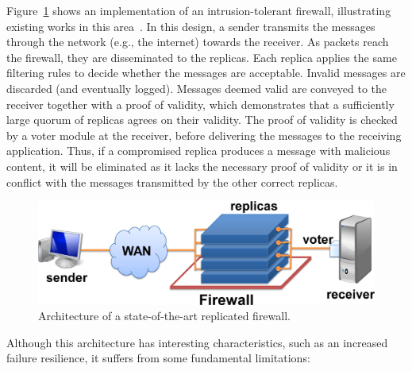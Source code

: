 Figure~\ref{fig:traditional} shows an implementation of an intrusion-tolerant firewall, illustrating  existing works in this area~\cite{Sousa:2010,Roeder:2010}.
In this design, a sender transmits the messages through the network (e.g., the internet) towards the receiver.
As packets reach the firewall, they are disseminated to the replicas. 
Each replica applies the same filtering rules to decide whether the messages are acceptable. 
Invalid messages are discarded (and eventually logged). 
Messages deemed valid are conveyed to the receiver together with a proof of validity, which demonstrates that a sufficiently large quorum of replicas agrees on their validity.
The proof of validity is checked by a voter module at the receiver, before delivering the messages to the receiving application.
Thus, if a compromised replica produces a message with malicious content, it will be eliminated as it lacks the necessary proof of validity or it is in conflict with the messages transmitted by the other correct replicas.

\begin{figure}[!t]
\begin{center}
\includegraphics[width=.8\columnwidth]{images/images/arch_traditional.pdf}
\caption{Architecture of a state-of-the-art replicated firewall.}
\label{fig:traditional}
\end{center}
\end{figure}

Although this architecture has interesting characteristics, such as an increased failure resilience, it suffers from some fundamental limitations:

